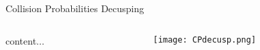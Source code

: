 
\begin{frame}[t]{Collision Probabilities Decusping}
    
\begin{columns}
    \begin{column}{0.4\textwidth}
        content...
    \end{column}
    \begin{column}{0.6\textwidth}
    \begin{figure}[h]
      \centering
      \texttt{[image: CPdecusp.png]}
    \end{figure}
\end{column}
\end{columns}
    
\end{frame}